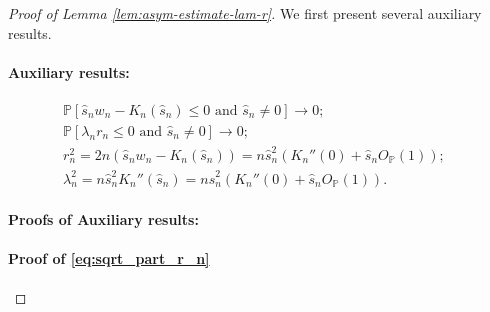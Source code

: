 \documentclass[12pt]{article}
\theoremstyle{definition}
\def\P{\mathbb{P}}
\def\P{\mathbb{P}}
\renewcommand{\P}{\mathbb{P}}							%
\begin{document}
\begin{proof}[Proof of Lemma \ref{lem:asym-estimate-lam-r}]

	We first present several auxiliary results.
	\paragraph{Auxiliary results:}
	\begin{align}
		\P\left[\hat s_n w_n - K_n(\hat s_n)\leq  0\text{ and }\hat s_n\neq 0\right]\rightarrow 0;&\label{eq:sqrt_part_r_n}
		\\
		\P[\lambda_nr_n\leq  0\text{ and }\hat s_n\neq 0]\rightarrow0; & \label{eq:sign_property_r_n_lambda_n}
		\\
		r^2_n=2n( \hat s_n w_n - K_n(\hat s_n))=n\hat s_n^2 \left(K_n''(0)+\hat s_nO_{\P}(1)\right); & \label{eq:asym-estimate-r}\\
		\lambda_n^2=n\hat s_n^2K_n''(\hat s_n)
		=n\hat s_n^2 \left(K_n''(0)+\hat s_nO_{\P}(1)\right). &\label{eq:asym-estimate-lam}
	\end{align}

	\paragraph{Proofs of Auxiliary results:}

	\paragraph{Proof of \eqref{eq:sqrt_part_r_n}}


\end{proof}
\end{document}
